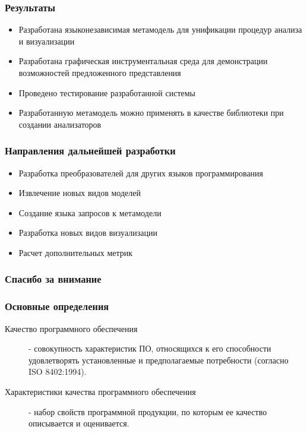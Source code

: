 \documentclass{beamer}
\begin{document}
\begin{frame}
\frametitle{Результаты}

\begin{itemize}
    \item Разработана языконезависимая метамодель для унификации процедур анализа
    и визуализации
    \item Разработана графическая инструментальная среда для демонстрации
    возможностей предложенного представления
    \item Проведено тестирование разработанной системы
    \item Разработанную метамодель можно применять в качестве библиотеки при
    создании анализаторов
\end{itemize}

\end{frame}
\begin{frame}
\frametitle{Направления дальнейшей разработки}

\begin{itemize}
    \item Разработка преобразователей для других языков программирования
    \item Извлечение новых видов моделей
    \item Создание языка запросов к метамодели
    \item Разработка новых видов визуализации
    \item Расчет дополнительных метрик
\end{itemize}

\end{frame}
\begin{frame}
\frametitle{Спасибо за внимание}
\end{frame}

\setcounter{finalframe}{\value{framenumber}}

\begin{frame}
\frametitle{Основные определения}

    \begin{description}
        \item[Качество программного обеспечения] - совокупность характеристик ПО,
    относящихся к его способности удовлетворять установленные и предполагаемые
    потребности (согласно ISO 8402:1994).
        \item[Характеристики качества программного обеспечения] - набор свойств
    программной продукции, по которым ее качество описывается и оценивается.
    \end{description}
\end{frame}
\end{document}
